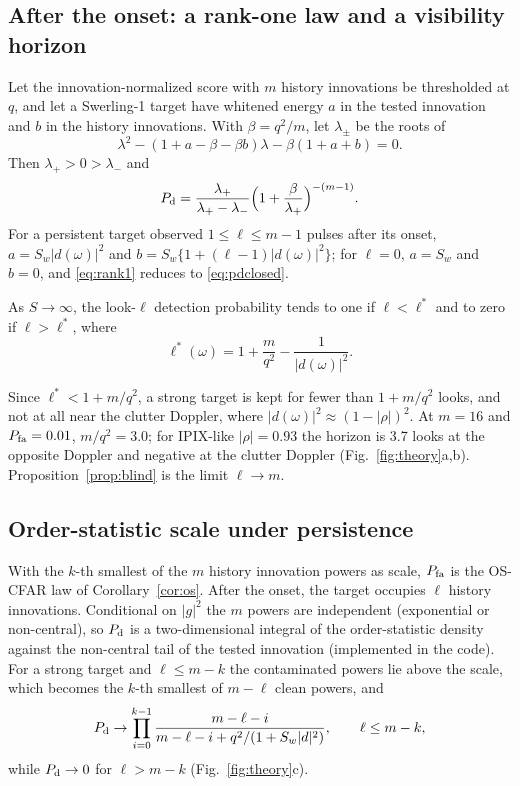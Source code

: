 \subsection{After the onset: a rank-one law and a visibility horizon}
\begin{proposition}\label{prop:rank1}
Let the innovation-normalized score with $m$ history innovations be thresholded at $q$, and let a Swerling-1 target have whitened energy $a$ in the tested innovation and $b$ in the history innovations. With $\beta=q^2/m$, let $\lambda_\pm$ be the roots of
\[
\lambda^2-(1+a-\beta-\beta b)\lambda-\beta(1+a+b)=0 .
\]
Then $\lambda_+>0>\lambda_-$ and
\begin{equation}
P_{\rm d}=\frac{\lambda_+}{\lambda_+-\lambda_-}\Big(1+\frac{\beta}{\lambda_+}\Big)^{-(m-1)}.
\label{eq:rank1}
\end{equation}
For a persistent target observed $1\le\ell\le m-1$ pulses after its onset, $a=S_w|d(\omega)|^2$ and $b=S_w\{1+(\ell-1)|d(\omega)|^2\}$; for $\ell=0$, $a=S_w$ and $b=0$, and \eqref{eq:rank1} reduces to \eqref{eq:pdclosed}.
\end{proposition}
\begin{corollary}\label{cor:horizon}
As $S\to\infty$, the look-$\ell$ detection probability tends to one if $\ell<\ell^*$ and to zero if $\ell>\ell^*$, where
\begin{equation}
\ell^*(\omega)=1+\frac{m}{q^2}-\frac{1}{|d(\omega)|^2}.
\label{eq:horizon}
\end{equation}
\end{corollary}
Since $\ell^*<1+m/q^2$, a strong target is kept for fewer than $1+m/q^2$ looks, and not at all near the clutter Doppler, where $|d(\omega)|^2\approx(1-|\rho|)^2$. At $m=16$ and $P_{\rm fa}=0.01$, $m/q^2=3.0$; for IPIX-like $|\rho|=0.93$ the horizon is 3.7 looks at the opposite Doppler and negative at the clutter Doppler (Fig.~\ref{fig:theory}a,b). Proposition~\ref{prop:blind} is the limit $\ell\to m$.

\subsection{Order-statistic scale under persistence}
With the $k$-th smallest of the $m$ history innovation powers as scale, $P_{\rm fa}$ is the OS-CFAR law of Corollary~\ref{cor:os}. After the onset, the target occupies $\ell$ history innovations. Conditional on $|g|^2$ the $m$ powers are independent (exponential or non-central), so $P_{\rm d}$ is a two-dimensional integral of the order-statistic density against the non-central tail of the tested innovation (implemented in the code). For a strong target and $\ell\le m-k$ the contaminated powers lie above the scale, which becomes the $k$-th smallest of $m-\ell$ clean powers, and
\begin{equation}
P_{\rm d}\to\prod_{i=0}^{k-1}\frac{m-\ell-i}{m-\ell-i+q^2/(1+S_w|d|^2)},\qquad \ell\le m-k,
\label{eq:osstrong}
\end{equation}
while $P_{\rm d}\to0$ for $\ell>m-k$ (Fig.~\ref{fig:theory}c).

